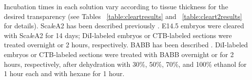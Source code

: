 Incubation times in each solution vary according to tissue thickness for the desired transparency (see Tables ~\ref{table:cleartresults} and ~\ref{table:cleart2results} for details).
Sca\emph{l}eA2 has been described previously \cite{hama2011scale}.
E14.5 embryos were cleared with Sca\emph{l}eA2 for 14 days; DiI-labeled embryos or CTB-labeled sections were treated overnight or 2 hours, respectively.
BABB has been described \cite{dodt2007ultramicroscopy}.
DiI-labeled embryos or CTB-labeled sections were treated with BABB overnight or for 2 hours, respectively, after dehydration with 30\%, 50\%, 70\%, and 100\% ethanol for 1 hour each and with hexane for 1 hour.
